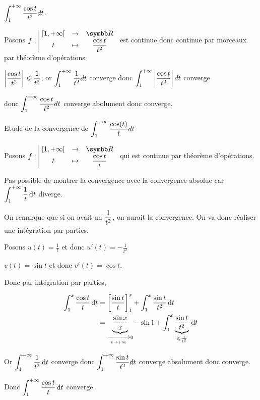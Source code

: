 \begin{exemple}
    $\displaystyle \int_1^{+ \infty} \frac{\cos t}{t^2} dt$. 

    Posons $\fonction f {[1, + \infty[}{\R}{t}{\frac{\cos t}{t^2}}$ est continue donc continue par 
    morceaux par théorème d'opérations. 

    $ \displaystyle \left| \frac{\cos t}{t^2} \right| \leqslant \frac{1}{t^2}$, or $\displaystyle \int_1^{+ \infty} \frac{1}{t^2} dt$ converge donc
    $\displaystyle \int_1^{+ \infty} \left| \frac{\cos t}{t^2} \right| dt$ converge
    
    donc $\displaystyle \int_1^{+ \infty} \frac{\cos t}{t^2} dt$ converge abolument donc converge. 
\end{exemple}

\begin{exemple}
    Etude de la convergence de $\displaystyle \int_1^{+ \infty} \frac{\cos(t)}{t} dt$

    Posons $\fonction f {[1, + \infty[}{\R}{t}{\frac{\cos t}{t}}$ qui est continue par théorème d'opérations.

    Pas possible de montrer la convergence avec la convergence absolue car $\displaystyle \int_1^{+ \infty} \frac{1}{t} \,\mathrm{d}t$ diverge.

    On remarque que si on avait un $\displaystyle \frac 1 {t^2}$, on aurait la convergence. On va donc 
    réaliser une intégration par parties.

    Posons $u(t) = \frac 1 t$ et donc $u'(t) = - \frac 1 {t^2}$ 

    $v(t) = \sin t$ et donc $v'(t) = \cos t$.

    Donc par intégration par parties, 

    \begin{align}
        \int_1^x \frac{\cos t}{t} \,\mathrm{d}t &= \left[ \frac{\sin t}{t} \right]_1^x + \int_1^x \frac{\sin t}{t^2} \,\mathrm{d}t \\
        &= \underbrace{\frac{\sin x}{x}}_{\xrightarrow[x \to + \infty   ]{} 0} - \sin 1 + \int_1^x \underbrace{\frac{\sin t}{t^2}}_{\leqslant \frac 1 {t^2}} \,\mathrm{d}t
    \end{align}

    Or $\displaystyle \int_1^{+ \infty} \frac{1}{t^2} \,\mathrm{d}t$ converge donc $\displaystyle \int_1^{+ \infty} \frac{\sin t}{t^2} dt$ converge absolument donc converge.

    Donc $\displaystyle \int_1^{+ \infty} \frac{\cos t}{t} \,\mathrm{d}t$ converge.
\end{exemple}

